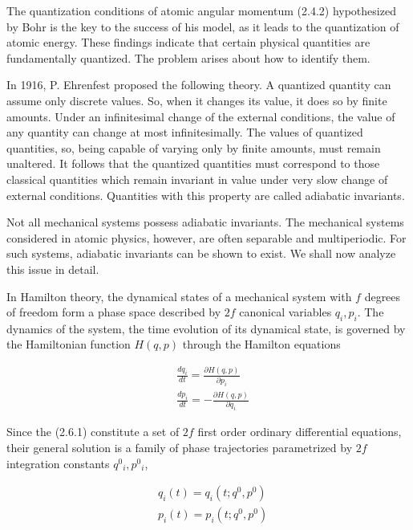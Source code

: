 \documentclass{article}
\begin{document}
The quantization conditions of atomic angular momentum (2.4.2) hypothesized by Bohr is the key to the success of his model, as it leads to the quantization of atomic energy. These findings indicate that certain physical quantities are fundamentally quantized. The problem arises about how to identify them.

In 1916, P. Ehrenfest proposed the following theory. A quantized quantity can assume only discrete values. So, when it changes its value, it does so by finite amounts. Under an infinitesimal change of the external conditions, the value of any quantity can change at most infinitesimally. The values of quantized quantities, so, being capable of varying only by finite amounts, must remain unaltered. It follows that the quantized quantities must correspond to those classical quantities which remain invariant in value under very slow change of external conditions. Quantities with this property are called adiabatic invariants.

Not all mechanical systems possess adiabatic invariants. The mechanical systems considered in atomic physics, however, are often separable and multiperiodic. For such systems, adiabatic invariants can be shown to exist. We shall now analyze this issue in detail.

In Hamilton theory, the dynamical states of a mechanical system with $f$ degrees of freedom form a phase space described by $2 f$ canonical variables $q_{i}, p_{i}$. The dynamics of the system, the time evolution of its dynamical state, is governed by the Hamiltonian function $H(q, p)$ through the Hamilton equations
 
\begin{align*}
& \frac{d q_{i}}{d t}=\frac{\partial H(q, p)}{\partial p_{i}}  \tag{2.6.1a}\\
& \frac{d p_{i}}{d t}=-\frac{\partial H(q, p)}{\partial q_{i}} \tag{2.6.1b}
\end{align*}
 

Since the (2.6.1) constitute a set of $2 f$ first order ordinary differential equations, their general solution is a family of phase trajectories parametrized by $2 f$ integration constants $q^{0}{ }_{i}, p^{0}{ }_{i}$,
 
\begin{align*}
& q_{i}(t)=q_{i}\left(t ; q^{0}, p^{0}\right)  \tag{2.6.2a}\\
& p_{i}(t)=p_{i}\left(t ; q^{0}, p^{0}\right) \tag{2.6.2~b}
\end{align*}
 
\end{document}
